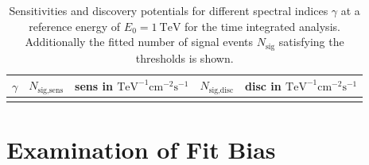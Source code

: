 \begin{table}
  \centering
  \caption{Sensitivities and discovery potentials for different spectral indices $\gamma$ at a reference energy of $E_0 = \SI{1}{\tera\electronvolt}$ for the time integrated analysis. Additionally the fitted number of signal events $N_\text{sig}$ satisfying the thresholds is shown.}
  \begin{tabular}{crcrc}
    \toprule
    $\gamma$ & $N_\text{sig,sens}$ &  sens in $\si{\tera\electronvolt\tothe{-1}\centi\meter\tothe{-2}\second\tothe{-1}}$ & $N_\text{sig,disc}$ & disc in $\si{\tera\electronvolt\tothe{-1}\centi\meter\tothe{-2}\second\tothe{-1}}$ \\
    \toprule
      
    \toprule
    \label{tab:sens_disc_time_int}
  \end{tabular}
\end{table}

\section{Examination of Fit Bias}

